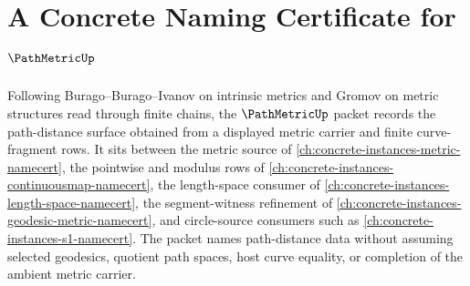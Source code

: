 \chapter{A Concrete Naming Certificate for $\PathMetricUp$}
\label{ch:concrete-instances-path-metric-namecert}

Following Burago--Burago--Ivanov on intrinsic metrics and Gromov on metric structures read through finite chains, the $\PathMetricUp$ packet records the path-distance surface obtained from a displayed metric carrier and finite curve-fragment rows. It sits between the metric source of \autoref{ch:concrete-instances-metric-namecert}, the pointwise and modulus rows of \autoref{ch:concrete-instances-continuousmap-namecert}, the length-space consumer of \autoref{ch:concrete-instances-length-space-namecert}, the segment-witness refinement of \autoref{ch:concrete-instances-geodesic-metric-namecert}, and circle-source consumers such as \autoref{ch:concrete-instances-s1-namecert}. The packet names path-distance data without assuming selected geodesics, quotient path spaces, host curve equality, or completion of the ambient metric carrier.


